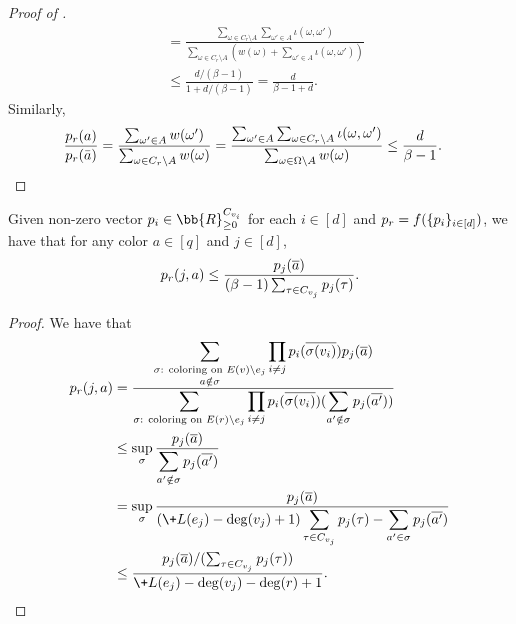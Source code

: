 \documentclass[a4paper,11pt]{article}
\newcommand{\pin}{\leftarrow}
\begin{document}
\begin{proof}[Proof of ]
\begin{align*}
&= \frac{\sum_{\omega\in C_r\setminus A} \sum_{\omega'\in A} \iota(\omega, \omega')}
        {\sum_{\omega\in C_r\setminus A} \left(w(\omega) + \sum_{\omega'\in A}\iota(\omega, \omega')\right)}\\
&\le \frac{d/(\beta-1)}{1 + d/(\beta-1)} = \frac{d}{\beta-1+d}.
\end{align*}
Similarly,
\begin{align*}
\frac{\*p_r(a)}{\*p_r(\bar{a})}
&= \frac{\sum_{\omega'\in A} w(\omega')}{\sum_{\omega\in C_r\setminus A} w(\omega)}
= \frac{\sum_{\omega'\in A}\sum_{\omega\in C_r\setminus A} \iota(\omega, \omega')}
        {\sum_{\omega\in \Omega\setminus A} w(\omega)}
\le \frac{d}{\beta-1}.
\end{align*}
    \end{proof}
    
\begin{lemma}\label{lem:marginal_bound_2}
    Given non-zero vector $\*p_i\in \bb{R}_{\geq 0}^{C_{v_i}}$ for each $i\in [d]$ and $\*p_r = f(\{\*p_i\}_{i\in[d]})$, we have that for any color $a\in [q]$ and $j\in [d]$,
    $$
        \*p_r(j,a) \leq \frac{\*p_j(\overline a)}{(\beta - 1)\sum_{\tau\in C_{v_j}}\*p_j(\tau)}.
    $$
\end{lemma}
\begin{proof}
        We have that
        \begin{align*}
            \*p_r(j,a) &= \frac{\displaystyle \sum_{\substack{\sigma\text{: coloring on }E(v)\setminus e_j\\a\notin \sigma}} \prod_{i\neq j}\*p_i(\overline{\sigma(v_i)})\*p_j(\overline{a})}{\displaystyle \sum_{\sigma\text{: coloring on }E(r)\setminus e_j} \prod_{i\neq j}\*p_i(\overline{\sigma(v_i)})(\sum_{a'\notin \sigma} \*p_j(\overline{a'}))}
            \\&\leq \sup_{\sigma}\frac{\displaystyle \*p_j(\overline{a})}{\displaystyle \sum_{a'\notin \sigma} \*p_j(\overline{a'})}
            \\&= \sup_{\sigma}\frac{\displaystyle \*p_j(\overline{a})}{\displaystyle(\+L(e_j) - \deg(v_j) + 1)\sum_{\tau\in C_{v_j}}\*p_j(\tau) - \sum_{a'\in \sigma} \*p_j(\overline{a'})}
            \\&\leq \frac{\*p_j(\overline{a})/(\sum_{\tau\in C_{v_j}}\*p_j(\tau))}{\+L(e_j) - \deg(v_j) - \deg(r) + 1}.
\end{align*}
\end{proof}
 
\newcommand{\ma}{\mu_{E-i}^{i\pin a}}
\newcommand{\mb}{\mu_{E-i}^{i\pin b}}
\newcommand{\mab}{\mu_{E-i}^{\substack{i\pin a\\j\pin b}}}
\newcommand{\mba}{\mu_{E-i}^{\substack{i\pin b\\j\pin a}}}
\newcommand{\man}{\mu_{E-i}^{\substack{i\pin a\\b\notin N}}}
\newcommand{\mbn}{\mu_{E-i}^{\substack{i\pin b\\a\notin N}}}
\renewcommand{\pab}{\mu_{E-i}^{i\pin a}(j\pin b)}
\newcommand{\pba}{\mu_{E-i}^{i\pin b}(j\pin a)}
\newcommand{\pan}{\mu_{E-i}^{i\pin a}(b\notin N)}
\newcommand{\pbn}{\mu_{E-i}^{i\pin b}(a\notin N)}
\newcommand{\sjn}{\sum_{j\in N}}
\newcommand{\sj}{\sum_{j}}
\end{document}
